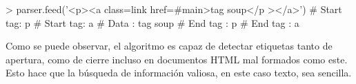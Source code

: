\begin{Schunk}
    \begin{Soutput}
        > parser.feed('<p><a class=link href=#main>tag soup</p ></a>')
        # Start tag: p
        # Start tag: a
        # Data     : tag soup
        # End tag  : p
        # End tag  : a
    \end{Soutput}
\end{Schunk}

Como se puede observar, el algoritmo es capaz de detectar etiquetas tanto de apertura, como de cierre incluso
en documentos HTML mal formados como este. Esto hace que la búsqueda de información valiosa, en este caso
texto, sea sencilla.


